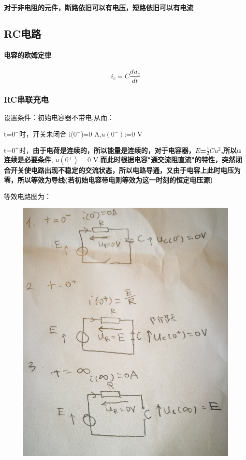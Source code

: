 \documentclass[12pt]{book}
\theoremstyle{definition}\newtheorem{dfn}{Définition}[chapter]
\theoremstyle{plain}\newtheorem{thm}{Théorème}[chapter]
\theoremstyle{plain}\newtheorem{prp}{Proposition}[chapter]
\theoremstyle{plain}\newtheorem{lem}{\bf Lemme}[chapter]
\theoremstyle{plain}\newtheorem{axm}{\bf Axiome}[chapter]
\theoremstyle{plain}\newtheorem{lmm}{\bf Lemme}[chapter]
\theoremstyle{plain}\newtheorem{cor}{\bf Corollaire}[chapter]
\theoremstyle{remark}\newtheorem{rem}{Remarque}[chapter]
\begin{document}
\textbf{对于非电阻的元件，断路依旧可以有电压，短路依旧可以有电流}
\subsection{RC电路}
\paragraph{电容的欧姆定律}
$$
i_c=C\frac{du_c}{dt}
$$



\subsubsection{RC串联充电}
设置条件：初始电容器不带电,从而：

t=$0^-$时，开关未闭合 i($0^-$)=0 A,$u(0^-)$:=0 V

t=$0^+$时，\textbf{由于电荷是连续的，所以能量是连续的，对于电容器，$\mathit{E}$=$\frac{1}{2}Cu^2$,所以u连续是必要条件},
$u(0^+)=0$ V.\textbf{而此时根据电容"通交流阻直流"的特性，突然闭合开关使电路出现不稳定的交流状态，所以电路导通，又由于电容上此时电压为零，所以等效为导线(若初始电容带电则等效为这一时刻的恒定电压源)}

等效电路图为：
\begin{figure}[H]
	\centering
	\includegraphics[scale=0.2]{image//Circuit lineaire du premier ordre//2}
\end{figure}
\end{document}
